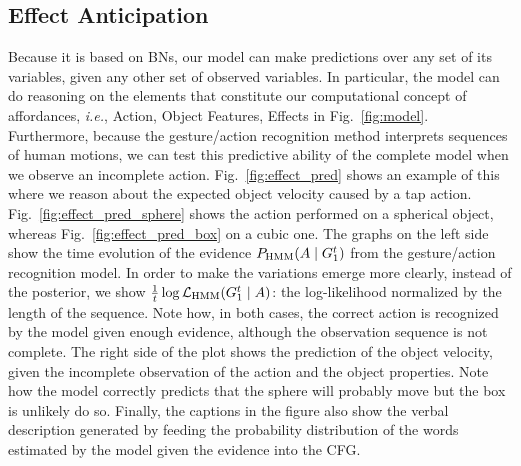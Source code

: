 \subsection{Effect Anticipation}
\label{sec:results:anticipation_effects}

Because it is based on \aclp{BN}, our model can make predictions over any set of its variables, given any other set of observed variables.
In particular, the model can do reasoning on the elements that constitute our computational concept of affordances, \textit{i.e.}, Action, Object Features, Effects in Fig.~\ref{fig:model}.
Furthermore, because the gesture/action recognition method interprets sequences of human motions, we can test this predictive ability of the complete model when we observe an incomplete action.
Fig.~\ref{fig:effect_pred} shows an example of this where we reason about the expected object velocity caused by a tap action.
Fig.~\ref{fig:effect_pred_sphere} shows the action performed on a spherical object, whereas Fig.~\ref{fig:effect_pred_box} on a cubic one.
The graphs on the left side show the time evolution of the evidence $P_{\text{HMM}}(A \mid G_1^t)$ from the gesture/action recognition model.
In order to make the variations emerge more clearly, instead of the posterior, we show $\frac{1}{t}\log\mathcal{L}_\text{HMM}(G_1^t \mid A)$: the log-likelihood normalized by the length of the sequence.
Note how, in both cases, the correct action is recognized by the model given enough evidence, although the observation sequence is not complete.
The right side of the plot shows the prediction of the object velocity, given the incomplete observation of the action and the object properties.
Note how the model correctly predicts that the sphere will probably move but the box is unlikely do so.
Finally, the captions in the figure also show the verbal description generated by feeding the probability distribution of the words estimated by the model given the evidence into the \acl{CFG}.


